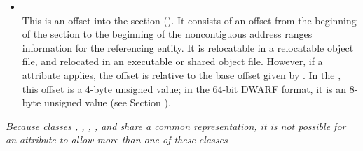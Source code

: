 \begin{itemize}
\item {} \\
This is an 
offset into the \dotdebugranges{} section
(\DWFORMsecoffset). 
It consists of an
offset from the beginning of the 
\dotdebugranges{} section
to the beginning of the non\dash contiguous address ranges
information for the referencing entity.  
It is relocatable in
a relocatable object file, and relocated in an executable or
shared object file. 
However, if a \DWATrangesbase{} attribute applies, the offset
is relative to the base offset given by \DWATrangesbase.
In the \thirtytwobitdwarfformat, this offset
is a 4-byte unsigned value; in the 64-bit DWARF
format, it is an 8-byte unsigned value (see Section
).
\end{itemize}

\textit{Because classes
\CLASSaddrptr, 
\CLASSlineptr, 
\CLASSloclistptr, 
\CLASSmacptr, 
\CLASSrangelistptr{} and
\CLASSstroffsetsptr{}
share a common representation, it is not possible for an
attribute to allow more than one of these classes}


